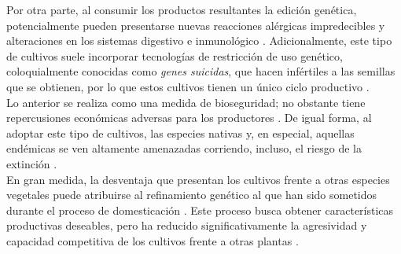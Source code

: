 \begin{itemize}[leftmargin=0cm, itemsep=0.5 cm]
	
	Por otra parte, al consumir los productos resultantes la edición genética, potencialmente pueden presentarse nuevas reacciones alérgicas impredecibles y alteraciones en los sistemas digestivo e inmunológico \cite{Verma_2011}. Adicionalmente, este tipo de cultivos suele incorporar tecnologías de restricción de uso genético, coloquialmente conocidas como \textit{genes suicidas}, que hacen infértiles a las semillas que se obtienen, por lo que estos cultivos tienen un único ciclo productivo \cite{Daniell_2002}.\\
	
	
	Lo anterior se realiza como una medida de bioseguridad; no obstante tiene repercusiones económicas adversas para los productores \cite{VanAcker_2007}. De igual forma, al adoptar este tipo de cultivos, las especies nativas y, en especial, aquellas endémicas se ven altamente amenazadas corriendo, incluso, el riesgo de la extinción \cite{Kumar_2020}.\\
	
	
	En gran medida, la desventaja que presentan los cultivos frente a otras especies vegetales puede atribuirse al refinamiento genético al que han sido sometidos durante el proceso de domesticación \cite{Moreira_2018}. Este proceso busca obtener características productivas deseables, pero ha reducido significativamente la agresividad y capacidad competitiva de los cultivos frente a otras plantas \cite{DaSilva_2007, Concenco_2012}.
	
\end{itemize}


